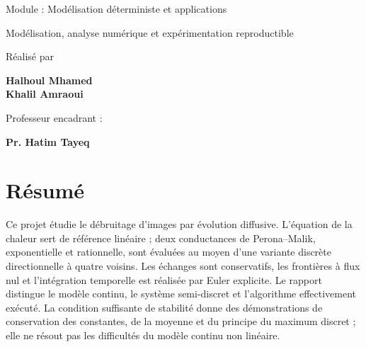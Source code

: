 \documentclass[11pt,a4paper,oneside]{report}
\begin{document}
\begin{titlepage}
\begin{center}
\vspace{0.35cm}
{\small Module : Modélisation déterministe et applications\par}
\vspace{0.16cm}
{\small Modélisation, analyse numérique et expérimentation reproductible\par}
\end{center}
\vfill
\begin{minipage}[t]{0.45\linewidth}
{\small\color{coverteal} Réalisé par\par}
\vspace{0.12cm}
{\large\bfseries Halhoul Mhamed\\Khalil Amraoui\par}
\end{minipage}\hfill
\begin{minipage}[t]{0.45\linewidth}
\raggedleft
{\small\color{coverteal} Professeur encadrant :\par}
\vspace{0.12cm}
{\large\bfseries Pr. Hatim Tayeq\par}
\end{minipage}
\vspace{0.55cm}
\end{titlepage}
\hypersetup{pageanchor=true}
\chapter*{Résumé}
Ce projet étudie le débruitage d'images par évolution diffusive.
L'équation de la chaleur sert de référence linéaire ; deux conductances
de Perona--Malik, exponentielle et rationnelle, sont évaluées au moyen
d'une variante discrète directionnelle à quatre voisins. Les échanges
sont conservatifs, les frontières à flux nul et l'intégration temporelle
est réalisée par Euler explicite. Le rapport distingue le modèle
continu, le système semi-discret et l'algorithme effectivement exécuté.
La condition suffisante de stabilité donne des démonstrations de
conservation des constantes, de la moyenne et du principe du maximum
discret ; elle ne résout pas les difficultés du modèle continu non linéaire.
\end{document}
